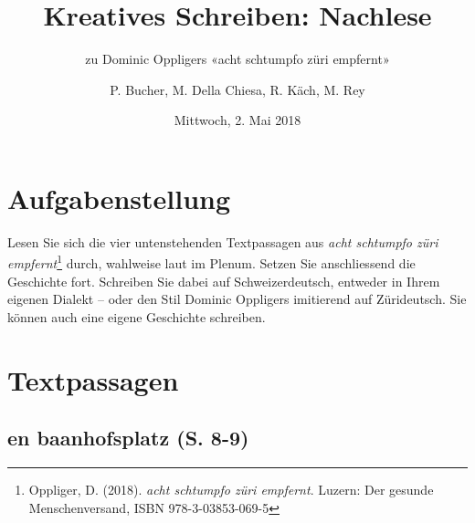 \documentclass[a4paper,11pt]{scrartcl}
\begin{document}
\title{Kreatives Schreiben: Nachlese}
\subtitle{zu Dominic Oppligers «acht schtumpfo züri empfernt»}
\author{P. Bucher, M. Della Chiesa, R. Käch, M. Rey}
\date{Mittwoch, 2. Mai 2018}
\maketitle 
\renewcommand{\baselinestretch}{1.5}

\section*{Aufgabenstellung}

Lesen Sie sich die vier untenstehenden Textpassagen aus \textit{acht schtumpfo züri empfernt}\footnote{Oppliger, D. (2018). \textit{acht schtumpfo züri empfernt}. Luzern: Der gesunde Menschenversand, ISBN 978-3-03853-069-5} durch, wahlweise laut im Plenum. Setzen Sie anschliessend die Geschichte fort. Schreiben Sie dabei auf Schweizerdeutsch, entweder in Ihrem eigenen Dialekt -- oder den Stil Dominic Oppligers imitierend auf Zürideutsch. Sie können auch eine eigene Geschichte schreiben.

\section*{Textpassagen}

\subsection*{en baanhofsplatz (S. 8-9)}
\end{document}
